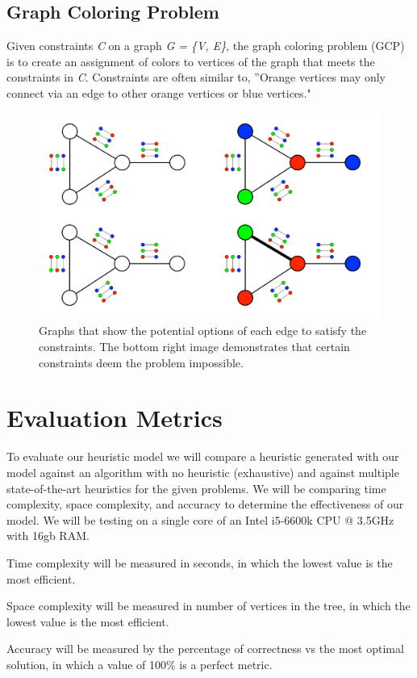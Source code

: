 \documentclass[10pt,twoside]{IEEEtran}
\begin{document}
\subsection{Graph Coloring Problem}
Given constraints \emph{C} on a graph \emph{G = \{V, E\}}, the graph coloring problem (GCP) is to create an assignment of colors to vertices of the graph that meets the constraints in \emph{C}. Constraints are often similar to, ''Orange vertices may only connect via an edge to other orange vertices or blue vertices."

\begin{figure}[h]
	\centering
	\includegraphics[width=0.7\linewidth]{../diagrams/GCP.jpg}
	\caption{Graphs that show the potential options of each edge to satisfy the constraints. The bottom right image demonstrates that certain constraints deem the problem impossible.}
	\label{GCP Fig}
\end{figure}

\section{Evaluation Metrics}
To evaluate our heuristic model we will compare a heuristic generated with our model against an algorithm with no heuristic (exhaustive) and against multiple state-of-the-art heuristics for the given problems. We will be comparing time complexity, space complexity, and accuracy to determine the effectiveness of our model. We will be testing on a single core of an Intel i5-6600k CPU @ 3.5GHz with 16gb RAM.

Time complexity will be measured in seconds, in which the lowest value is the most efficient.

Space complexity will be measured in number of vertices in the tree, in which the lowest value is the most efficient.

Accuracy will be measured by the percentage of correctness vs the most optimal solution, in which a value of 100\% is a perfect metric.
\end{document}
